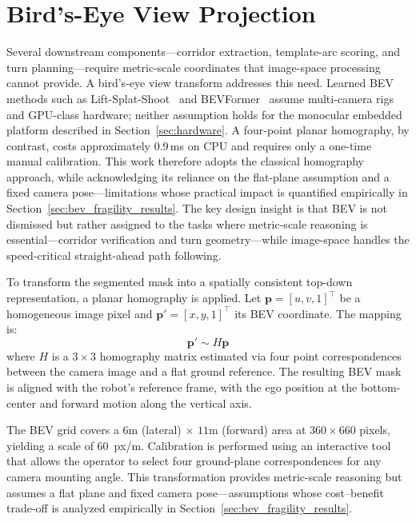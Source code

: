 \documentclass[12pt,letterpaper,oneside]{report}
\begin{document}
\section{Bird's-Eye View Projection}
\label{sec:bev}

Several downstream components---corridor extraction, template-arc scoring, and turn planning---require metric-scale coordinates that image-space processing cannot provide. A bird's-eye view transform addresses this need. Learned BEV methods such as Lift-Splat-Shoot~\cite{lift_splat_shoot} and BEVFormer~\cite{bevformer} assume multi-camera rigs and GPU-class hardware; neither assumption holds for the monocular embedded platform described in Section~\ref{sec:hardware}. A four-point planar homography, by contrast, costs approximately 0.9\,ms on CPU and requires only a one-time manual calibration. This work therefore adopts the classical homography approach, while acknowledging its reliance on the flat-plane assumption and a fixed camera pose---limitations whose practical impact is quantified empirically in Section~\ref{sec:bev_fragility_results}. The key design insight is that BEV is not dismissed but rather assigned to the tasks where metric-scale reasoning is essential---corridor verification and turn geometry---while image-space handles the speed-critical straight-ahead path following.

To transform the segmented mask into a spatially consistent top-down representation, a planar homography is applied. Let $\mathbf{p} = [u, v, 1]^\top$ be a homogeneous image pixel and $\mathbf{p}' = [x, y, 1]^\top$ its BEV coordinate. The mapping is:
\begin{equation}
\mathbf{p}' \sim H \mathbf{p}
\end{equation}
where $H$ is a $3\times3$ homography matrix estimated via four point correspondences between the camera image and a flat ground reference. The resulting BEV mask is aligned with the robot's reference frame, with the ego position at the bottom-center and forward motion along the vertical axis.

The BEV grid covers a $6\text{m}$ (lateral) $\times$ $11\text{m}$ (forward) area at $360 \times 660$ pixels, yielding a scale of 60~px/m. Calibration is performed using an interactive tool that allows the operator to select four ground-plane correspondences for any camera mounting angle. This transformation provides metric-scale reasoning but assumes a flat plane and fixed camera pose---assumptions whose cost--benefit trade-off is analyzed empirically in Section~\ref{sec:bev_fragility_results}.
\end{document}
